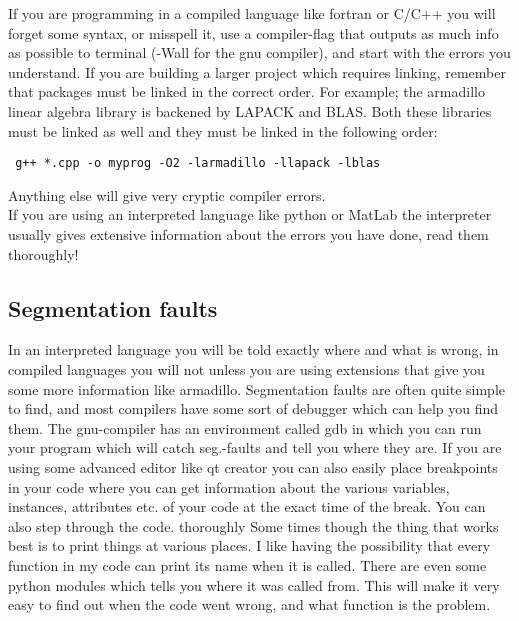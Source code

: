 If you are programming in a compiled language like fortran or C/C++ you will forget some syntax, or misspell it, use a compiler-flag that outputs as much info as possible to terminal (-Wall for the gnu compiler), and start with the errors you understand. If you are building a larger project which requires linking, remember that packages must be linked in the correct order. For example; the armadillo linear algebra library is backened by LAPACK and BLAS. Both these libraries must be linked as well and they must be linked in the following order:
\begin{lstlisting}
 g++ *.cpp -o myprog -O2 -larmadillo -llapack -lblas
\end{lstlisting}
Anything else will give very cryptic compiler errors. \\
If you are using an interpreted language like python or MatLab the interpreter usually gives extensive information about the errors you have done, read them thoroughly!

\subsection{Segmentation faults}
In an interpreted language you will be told exactly where and what is wrong, in compiled languages you will not unless you are using extensions that give you some more information like armadillo. Segmentation faults are often quite simple to find, and most compilers have some sort of debugger which can help you find them. 
The gnu-compiler has an environment called gdb in which you can run your program which will catch seg.-faults and tell you where they are. If you are using some advanced editor like qt creator you can also easily place breakpoints in your code where you can get information about the various variables, instances, attributes etc. of your code at the exact time of the break. You can also step through the code. thoroughly
Some times though the thing that works best is to print things at various places. I like having the possibility that every function in my code can print its name when it is called. There are even some python modules which tells you where it was called from. This will make it very easy to find out when the code went wrong, and what function is the problem.

